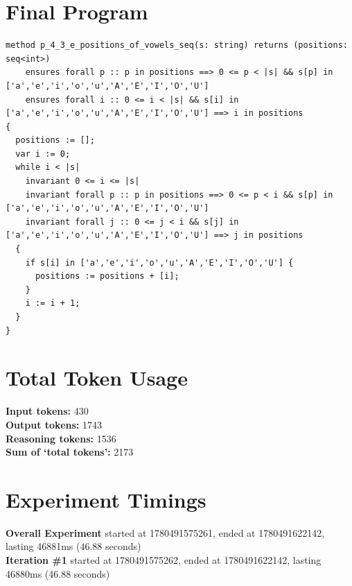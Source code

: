 \documentclass{article}
\begin{document}
\section*{Final Program}
\begin{lstlisting}
method p_4_3_e_positions_of_vowels_seq(s: string) returns (positions: seq<int>)
	ensures forall p :: p in positions ==> 0 <= p < |s| && s[p] in ['a','e','i','o','u','A','E','I','O','U']
	ensures forall i :: 0 <= i < |s| && s[i] in ['a','e','i','o','u','A','E','I','O','U'] ==> i in positions
{
  positions := [];
  var i := 0;
  while i < |s|
    invariant 0 <= i <= |s|
    invariant forall p :: p in positions ==> 0 <= p < i && s[p] in ['a','e','i','o','u','A','E','I','O','U']
    invariant forall j :: 0 <= j < i && s[j] in ['a','e','i','o','u','A','E','I','O','U'] ==> j in positions
  {
    if s[i] in ['a','e','i','o','u','A','E','I','O','U'] {
      positions := positions + [i];
    }
    i := i + 1;
  }
}
\end{lstlisting}
\section*{Total Token Usage}
\textbf{Input tokens: }430
\\\textbf{Output tokens: }1743
\\\textbf{Reasoning tokens: }1536
\\\textbf{Sum of `total tokens': }2173
\section*{Experiment Timings}
\textbf{Overall Experiment} started at 1780491575261, ended at 1780491622142, lasting 46881ms (46.88 seconds)
\\\textbf{Iteration \#1} started at 1780491575262, ended at 1780491622142, lasting 46880ms (46.88 seconds)
\end{document}
